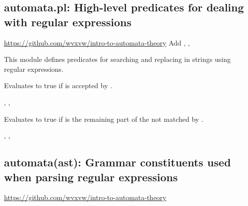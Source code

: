


\subsection{automata.pl: High-level predicates for dealing with regular expressions}

\label{sec:automata}

\begin{tags}
\url{https://github.com/wvxvw/intro-to-automata-theory}
Add , , 
\end{tags}

This module defines predicates for searching and replacing in strings
using regular expressions.\vspace{0.7cm}

\begin{description}
Evaluates to true if  is accepted by .

\begin{tags}
, , 
\end{tags}

Evaluates to true if  is the remaining part of the 
not matched by .

\begin{tags}
, , 
\end{tags}
\end{description}

\subsection{automata(ast): Grammar constituents used when parsing regular expressions}

\label{sec:ast}

\begin{tags}
\url{https://github.com/wvxvw/intro-to-automata-theory}
\end{tags}

